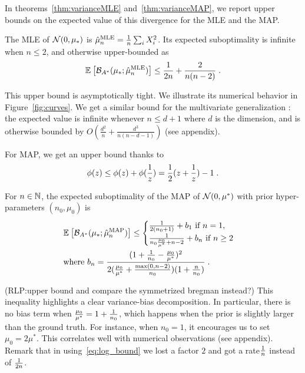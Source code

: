 \documentclass[twoside]{article}
\newcommand{\rlp}[1]{\textcolor{BrickRed}{(RLP:#1)}}
\newcommand*{\expect}[2][]{\ensuremath{\mathbb{E}_{#1} \left[ #2 \right] }} %
\newcommand{\logpart}{A}
\newcommand{\bregmanconj}{\cB_{\logpart^*}}
\newcommand{\m}{\mu}
\begin{document}
In theorems~\ref{thm:varianceMLE} and~\ref{thm:varianceMAP}, we report upper bounds on the expected value of this divergence for the MLE and the MAP.
\begin{theorem}
\label{thm:varianceMLE}
	The MLE of $\cN(0,\m_*)$ is $\hat \m_n^\text{MLE} = \inv{n} \sum_i X_i^2 $.
	Its expected suboptimality is infinite when $n\leq 2$, and otherwise upper-bounded as
	\begin{align}
		 \expect{\bregmanconj( \m_*; \hat \m_n^\text{MLE}) }
			\leq \inv{2n} +\frac{2}{n(n-2)} \; .
			\label{eq:MLE_rate}
	\end{align}
\end{theorem}
This upper bound is asymptotically tight.
We illustrate its numerical behavior in Figure~\ref{fig:curves}.
We get a similar bound for the multivariate generalization :
the expected value is infinite whenever $n \leq d+1$ where $d$ is the dimension, and is otherwise bounded by $O(\frac{d^2}{n} + \frac{d^3}{n(n-d-1)} )$ (see appendix).

For MAP, we get an upper bound thanks to
\begin{align}
	\label{eq:log_bound}
	\phi(z) \leq \phi(z) + \phi(\frac{1}{z}) =  \frac{1}{2} (z + \frac{1}{z}) - 1 \; .
\end{align}

\begin{theorem}
\label{thm:varianceMAP}
For $n\in \mathbb{N}$, the expected suboptimality of the MAP of $\cN(0,\m^*)$ with prior hyper-parameters $(n_0,\m_0)$ is
 \begin{align}
	& \expect{\bregmanconj( \m_*; \hat \m_n^\mathrm{MAP})}
	\leq \begin{cases}
		\inv{2(n_0+1)}  +  b_1 \ \text{if}\ n=1,\\
		\frac{1}{n_0 \frac{\m_0}{\m^*} +n-2} + b_n \ \text{if}\ n\geq 2
	\end{cases}
	\label{eq:MAP_rate}\\
	& \text{where }b_n = \frac{(1 + \inv{n_0} - \frac{\m_0}{\m^*})^2}{2 (\frac{\m_0}{\m^*}+\frac{\max(0,n-2)}{n_0})(1 + \frac{n}{n_0} )} \; . \nonumber
\end{align}
\end{theorem}
\rlp{upper bound and compare the symmetrized bregman instead?}
This inequality highlights a clear variance-bias decomposition.
In particular, there is no bias term when $\frac{\m_0}{\m^*} =1 + \inv{n_0} $, which happens when the prior is slightly larger than the ground truth.  For instance, when $n_0=1$, it encourages us to set $\m_0 = 2 \m^*$. This correlates well with numerical observations (see appendix).
Remark that in using~\eqref{eq:log_bound} we lost a factor $2$ and got a rate$\frac{1}{n}$ instead of $\frac{1}{2n}$.
\end{document}
